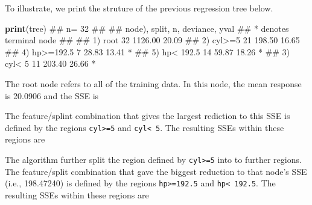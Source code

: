 \documentclass[]{book}
\newenvironment{Shaded}{\begin{snugshade}}{\end{snugshade}}
\newcommand{\CommentTok}[1]{\textcolor[rgb]{0.56,0.35,0.01}{\textit{#1}}}
\newcommand{\ControlFlowTok}[1]{\textcolor[rgb]{0.13,0.29,0.53}{\textbf{#1}}}
\newcommand{\DecValTok}[1]{\textcolor[rgb]{0.00,0.00,0.81}{#1}}
\newcommand{\KeywordTok}[1]{\textcolor[rgb]{0.13,0.29,0.53}{\textbf{#1}}}
\newcommand{\NormalTok}[1]{#1}
\newcommand{\OperatorTok}[1]{\textcolor[rgb]{0.81,0.36,0.00}{\textbf{#1}}}
\newcommand{\StringTok}[1]{\textcolor[rgb]{0.31,0.60,0.02}{#1}}
\theoremstyle{definition}
\theoremstyle{definition}
\theoremstyle{definition}
\theoremstyle{remark}
\begin{document}
To illustrate, we print the struture of the previous regression tree
below.

\begin{Shaded}
\begin{Highlighting}[]
\KeywordTok{print}\NormalTok{(tree)}
\NormalTok{## n= 32 }
\NormalTok{## }
\NormalTok{## node), split, n, deviance, yval}
\NormalTok{##       * denotes terminal node}
\NormalTok{## }
\NormalTok{## 1) root 32 1126.00 20.09  }
\NormalTok{##   2) cyl>=5 21  198.50 16.65  }
\NormalTok{##     4) hp>=192.5 7   28.83 13.41 *}
\NormalTok{##     5) hp< 192.5 14   59.87 18.26 *}
\NormalTok{##   3) cyl< 5 11  203.40 26.66 *}
\end{Highlighting}
\end{Shaded}

The root node refers to all of the training data. In this node, the mean
response is 20.0906 and the SSE is

\begin{Shaded}
\end{Shaded}

The feature/splint combination that gives the largest rediction to this
SSE is defined by the regions \texttt{cyl\textgreater{}=5} and
\texttt{cyl\textless{}\ 5}. The resulting SSEs within these regions are

\begin{Shaded}
\end{Shaded}

The algorithm further split the region defined by
\texttt{cyl\textgreater{}=5} into to further regions. The feature/split
combination that gave the biggest reduction to that node's SSE (i.e.,
198.47240) is defined by the regions \texttt{hp\textgreater{}=192.5} and
\texttt{hp\textless{}\ 192.5}. The resulting SSEs within these regions
are
\end{document}
